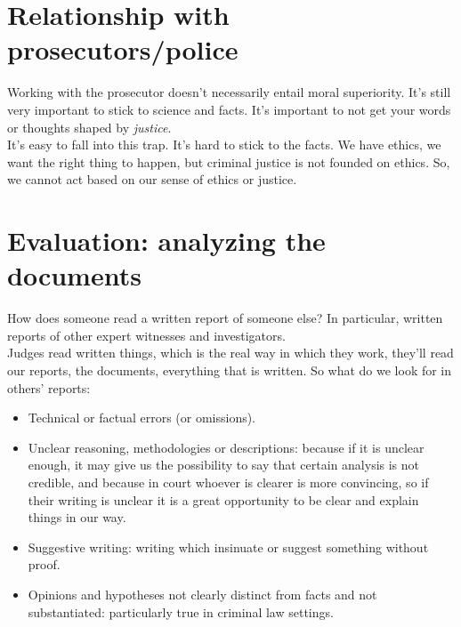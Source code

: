     \section{Relationship with prosecutors/police}
        Working with the prosecutor doesn't necessarily entail moral superiority. It's still very important to stick to science and facts. It's important to not get your words or thoughts shaped by \textit{justice}.\\
        It's easy to fall into this trap. It's hard to stick to the facts. We have ethics, we want the right thing to happen, but criminal justice is not founded on ethics. So, we cannot act based on our sense of ethics or justice.
    \section{Evaluation: analyzing the documents}
        How does someone read a written report of someone else? In particular, written reports of other expert witnesses and investigators.\\
        Judges read written things, which is the real way in which they work, they'll read our reports, the documents, everything that is written. So what do we look for in others' reports:
        \begin{itemize}
            \item Technical or factual errors (or omissions).
            \item Unclear reasoning, methodologies or descriptions: because if it is unclear enough, it may give us the possibility to say that certain analysis is not credible, and because in court whoever is clearer is more convincing, so if their writing is unclear it is a great opportunity to be clear and explain things in our way.
            \item Suggestive writing: writing which insinuate or suggest something without proof. 
            \item Opinions and hypotheses not clearly distinct from facts and not substantiated: particularly true in criminal law settings.
        \end{itemize}
